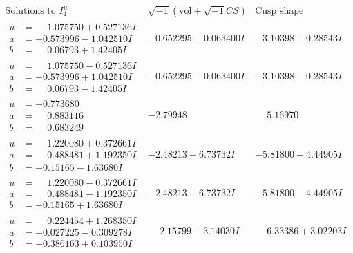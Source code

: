 \documentclass[1p]{elsarticle_modified}
\theoremstyle{definition}
\newcommand{\I}{\sqrt{-1}}
\begin{document}
$$\begin{array}{c|c|c}  
\text{Solutions to }I^u_{1}& \I (\text{vol} + \sqrt{-1}CS) & \text{Cusp shape}\\
 \hline 
\begin{aligned}
u &= \phantom{-}1.075750 + 0.527136 I \\
a &= -0.573996 - 1.042510 I \\
b &= \phantom{-}0.06793 + 1.42405 I\end{aligned}
 & -0.652295 - 0.063400 I & -3.10398 + 0.28543 I \\ \hline\begin{aligned}
u &= \phantom{-}1.075750 - 0.527136 I \\
a &= -0.573996 + 1.042510 I \\
b &= \phantom{-}0.06793 - 1.42405 I\end{aligned}
 & -0.652295 + 0.063400 I & -3.10398 - 0.28543 I \\ \hline\begin{aligned}
u &= -0.773680\phantom{ +0.000000I} \\
a &= \phantom{-}0.883116\phantom{ +0.000000I} \\
b &= \phantom{-}0.683249\phantom{ +0.000000I}\end{aligned}
 & -2.79948\phantom{ +0.000000I} & \phantom{-}5.16970\phantom{ +0.000000I} \\ \hline\begin{aligned}
u &= \phantom{-}1.220080 + 0.372661 I \\
a &= \phantom{-}0.488481 + 1.192350 I \\
b &= -0.15165 - 1.63680 I\end{aligned}
 & -2.48213 + 6.73732 I & -5.81800 - 4.44905 I \\ \hline\begin{aligned}
u &= \phantom{-}1.220080 - 0.372661 I \\
a &= \phantom{-}0.488481 - 1.192350 I \\
b &= -0.15165 + 1.63680 I\end{aligned}
 & -2.48213 - 6.73732 I & -5.81800 + 4.44905 I \\ \hline\begin{aligned}
u &= \phantom{-}0.224454 + 1.268350 I \\
a &= -0.027225 - 0.309278 I \\
b &= -0.386163 + 0.103950 I\end{aligned}
 & \phantom{-}2.15799 - 3.14030 I & \phantom{-}6.33386 + 3.02203 I \\ \hline\begin{aligned}

\end{aligned}
\end{array}$$
\end{document}
